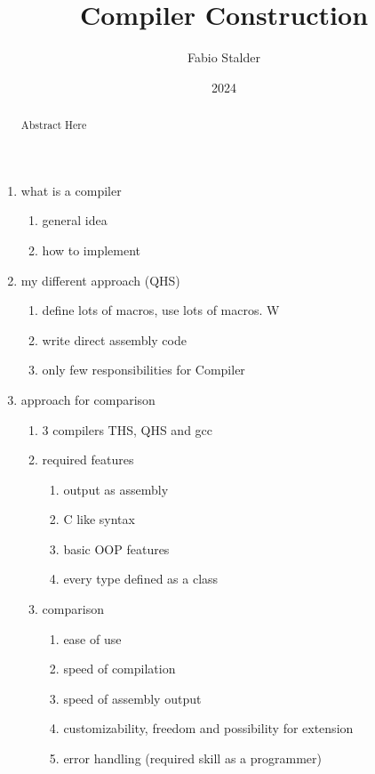 \documentclass[]{article}
\title{Compiler Construction}
\author{Fabio Stalder}
\date{2024}
\begin{document}
\maketitle
\begin{abstract}
    Abstract Here
\end{abstract}
\begin{enumerate}
    \item what is a compiler
          \begin{enumerate}
              \item general idea
              \item how to implement
          \end{enumerate}
    \item my different approach (QHS)
          \begin{enumerate}
              \item define lots of macros, use lots of macros. W
              \item write direct assembly code
              \item only few responsibilities for Compiler
          \end{enumerate}
    \item approach for comparison
          \begin{enumerate}
              \item 3 compilers THS, QHS and gcc
              \item required features
                    \begin{enumerate}
                        \item output as assembly
                        \item C like syntax
                        \item basic OOP features
                        \item every type defined as a class
                    \end{enumerate}
              \item comparison
                    \begin{enumerate}
                        \item ease of use
                        \item speed of compilation
                        \item speed of assembly output
                        \item customizability, freedom and possibility for extension
                        \item error handling (required skill as a programmer)

\end{enumerate}
\end{enumerate}
\end{enumerate}
\end{document}
